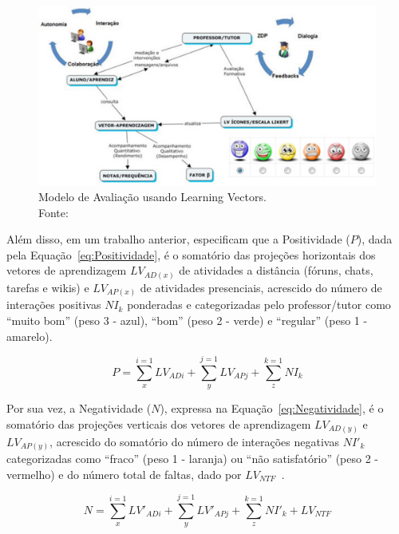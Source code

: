 \begin{figure}[htb]
	\centering
	\includegraphics[width=1\linewidth]{chapters/works/Sales2019_LearningVectors.png}
	\captionsetup{justification=centering}
	\caption{Modelo de Avaliação usando Learning Vectors. \\Fonte:~\cite{sales:2019}}
	\label{fig:Sales2019}
\end{figure}

Além disso, em um trabalho anterior, \cite{sales:2012} especificam que a Positividade ($P$), dada pela Equação~\ref{eq:Positividade}, é o somatório das projeções horizontais dos vetores de aprendizagem $LV_{AD(x)}$ de atividades a distância (fóruns, chats, tarefas e wikis) e $LV_{AP(x)}$ de atividades presenciais, acrescido do número de interações positivas $NI_k$ ponderadas e categorizadas pelo professor/tutor como ``muito bom'' (peso 3 - azul), ``bom'' (peso 2 - verde) e ``regular'' (peso 1 - amarelo).

\begin{equation}
	\label{eq:Positividade}
	P = \sum_{x}^{i=1} LV_{ADi} +  \sum_{y}^{j=1} LV_{APj} + \sum_{z}^{k=1} NI_k
\end{equation}

Por sua vez, a Negatividade ($N$), expressa na Equação~\ref{eq:Negatividade}, é o somatório das projeções verticais dos vetores de aprendizagem $LV_{AD(y)}$ e $LV_{AP(y)}$, acrescido do somatório do número de interações negativas $NI'_k$ categorizadas como ``fraco'' (peso 1 - laranja) ou ``não satisfatório'' (peso 2 - vermelho) e do número total de faltas, dado por $LV_{NTF}$~\citep{sales:2012}.

\begin{equation}
	\label{eq:Negatividade}
	N = \sum_{x}^{i=1} LV'_{ADi} +  \sum_{y}^{j=1} LV'_{APj} + \sum_{z}^{k=1} NI'_k + LV_{NTF}
\end{equation}

